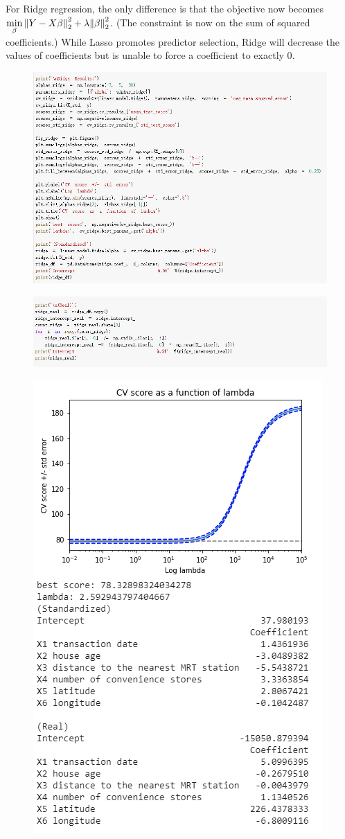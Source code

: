 \documentclass{article}
\begin{document}
For Ridge regression, the only difference is that the objective now becomes $\min\limits_{\beta} \norm{Y - X\beta}^2_2 + \lambda \norm{\beta}^2_2$. (The constraint is now on the sum of squared coefficients.) While Lasso promotes predictor selection, Ridge will decrease the values of coefficients but is unable to force a coefficient to exactly 0.
\begin{figure}[H]\includegraphics[width=\linewidth]{44.1}\end{figure}
\begin{figure}[H]\includegraphics[width=\linewidth]{44.2}\end{figure}
\begin{figure}[H]\includegraphics[width=0.63\linewidth]{45}\end{figure}
\end{document}
